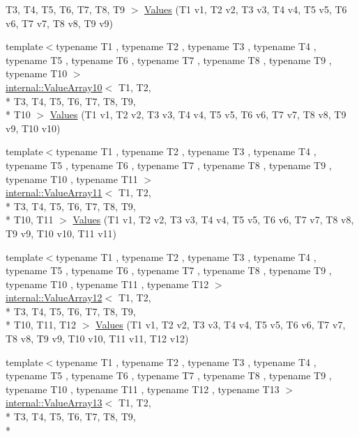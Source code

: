 \begin{DoxyCompactItemize}
T3, T4, T5, T6, T7, T8, T9 $>$ \hyperlink{namespacetesting_ab663e13807ad5cc223814797c9191a58}{Values} (T1 v1, T2 v2, T3 v3, T4 v4, T5 v5, T6 v6, T7 v7, T8 v8, T9 v9)
\item 
{\footnotesize template$<$typename T1 , typename T2 , typename T3 , typename T4 , typename T5 , typename T6 , typename T7 , typename T8 , typename T9 , typename T10 $>$ }\\\hyperlink{classtesting_1_1internal_1_1ValueArray10}{internal\-::\-Value\-Array10}$<$ T1, T2, \\*
T3, T4, T5, T6, T7, T8, T9, \\*
T10 $>$ \hyperlink{namespacetesting_a2948b0215fce80155fdbad4e3608f4cd}{Values} (T1 v1, T2 v2, T3 v3, T4 v4, T5 v5, T6 v6, T7 v7, T8 v8, T9 v9, T10 v10)
\item 
{\footnotesize template$<$typename T1 , typename T2 , typename T3 , typename T4 , typename T5 , typename T6 , typename T7 , typename T8 , typename T9 , typename T10 , typename T11 $>$ }\\\hyperlink{classtesting_1_1internal_1_1ValueArray11}{internal\-::\-Value\-Array11}$<$ T1, T2, \\*
T3, T4, T5, T6, T7, T8, T9, \\*
T10, T11 $>$ \hyperlink{namespacetesting_a4aaae77b8404038ed5f3bf56cccdb940}{Values} (T1 v1, T2 v2, T3 v3, T4 v4, T5 v5, T6 v6, T7 v7, T8 v8, T9 v9, T10 v10, T11 v11)
\item 
{\footnotesize template$<$typename T1 , typename T2 , typename T3 , typename T4 , typename T5 , typename T6 , typename T7 , typename T8 , typename T9 , typename T10 , typename T11 , typename T12 $>$ }\\\hyperlink{classtesting_1_1internal_1_1ValueArray12}{internal\-::\-Value\-Array12}$<$ T1, T2, \\*
T3, T4, T5, T6, T7, T8, T9, \\*
T10, T11, T12 $>$ \hyperlink{namespacetesting_a03e7f9611794732bb030c53365dc6c86}{Values} (T1 v1, T2 v2, T3 v3, T4 v4, T5 v5, T6 v6, T7 v7, T8 v8, T9 v9, T10 v10, T11 v11, T12 v12)
\item 
{\footnotesize template$<$typename T1 , typename T2 , typename T3 , typename T4 , typename T5 , typename T6 , typename T7 , typename T8 , typename T9 , typename T10 , typename T11 , typename T12 , typename T13 $>$ }\\\hyperlink{classtesting_1_1internal_1_1ValueArray13}{internal\-::\-Value\-Array13}$<$ T1, T2, \\*
T3, T4, T5, T6, T7, T8, T9, \\*

\end{DoxyCompactItemize}
